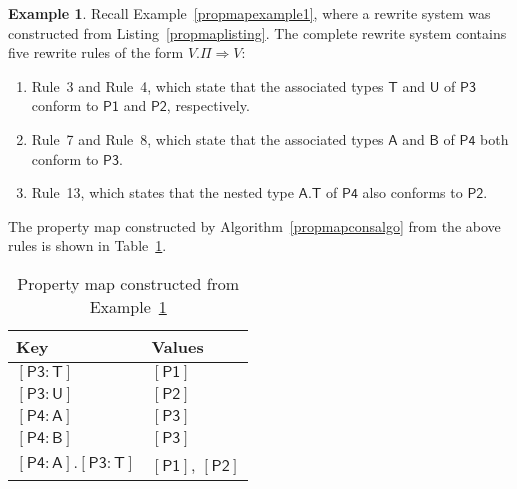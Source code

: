 \documentclass[headsepline,bibliography=totoc]{scrreport}
\newcommand{\namesym}[1]{\mathsf{#1}}
\newcommand{\genericparam}[1]{\bm{\mathsf{#1}}}
\newcommand{\proto}[1]{\bm{\mathsf{#1}}}
\newcommand{\protosym}[1]{[\proto{#1}]}
\newcommand{\assocsym}[2]{[\proto{#1}\colon\namesym{#2}]}
\theoremstyle{definition}
\newtheorem{example}{Example}[chapter]
\theoremstyle{definition}
\theoremstyle{definition}
\begin{document}
\begin{example}\label{propmapexample2}
Recall Example~\ref{propmapexample1}, where a rewrite system was constructed from Listing~\ref{propmaplisting}. The complete rewrite system contains five rewrite rules of the form $V.\Pi\Rightarrow V$:
\begin{enumerate}
\item Rule~3 and Rule~4, which state that the associated types $\namesym{T}$ and $\namesym{U}$ of $\proto{P3}$ conform to $\proto{P1}$ and $\proto{P2}$, respectively.
\item Rule~7 and Rule~8, which state that the associated types $\namesym{A}$ and $\namesym{B}$ of $\proto{P4}$ both conform to $\proto{P3}$.
\item Rule~13, which states that the nested type $\genericparam{A}.\genericparam{T}$ of $\proto{P4}$ also conforms to $\proto{P2}$.
\end{enumerate}
The property map constructed by Algorithm~\ref{propmapconsalgo} from the above rules is shown in Table~\ref{propmapexample2table}.
\end{example}
\begin{table}\caption{Property map constructed from Example~\ref{propmapexample2}}\label{propmapexample2table}
\begin{center}
\begin{tabular}{|l|l|}
\hline
Key&Values\\
\hline
\hline
$\assocsym{P3}{T}$&$\protosym{P1}$\\
$\assocsym{P3}{U}$&$\protosym{P2}$\\
$\assocsym{P4}{A}$&$\protosym{P3}$\\
$\assocsym{P4}{B}$&$\protosym{P3}$\\
$\assocsym{P4}{A}.\assocsym{P3}{T}$&$\protosym{P1}$, $\protosym{P2}$\\
\hline
\end{tabular}
\end{center}
\end{table}
\end{document}
